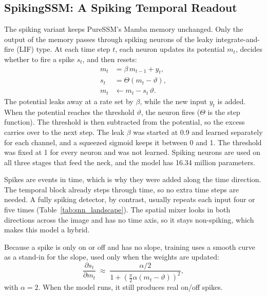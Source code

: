 \documentclass[11pt, a4paper]{report}
\begin{document}
\subsection{SpikingSSM: A Spiking Temporal Readout}
\label{subsec:spiking_method}
The spiking variant keeps PureSSM's Mamba memory unchanged. Only the output of the memory passes through
spiking neurons of the leaky integrate-and-fire (LIF) type. At each time step $t$, each neuron updates its
potential $m_t$, decides whether to fire a spike $s_t$, and then resets:
\begin{align}
  m_t &= \beta\, m_{t-1} + y_t, \label{eq:lif_integrate}\\
  s_t &= \Theta(m_t - \vartheta), \label{eq:lif_fire}\\
  m_t &\leftarrow m_t - s_t\,\vartheta. \label{eq:lif_reset}
\end{align}
The potential leaks away at a rate set by $\beta$, while the new input $y_t$ is added. When the potential
reaches the threshold $\vartheta$, the neuron fires ($\Theta$ is the step function). The threshold is then
subtracted from the potential, so the excess carries over to the next step. The leak $\beta$ was started at
0.9 and learned separately for each channel, and a squeezed sigmoid keeps it between 0 and 1. The
threshold was fixed at 1 for every neuron and was not learned. Spiking neurons are used on all three
stages that feed the neck, and the model has 16.34 million parameters.

Spikes are events in time, which is why they were added along the time direction. The temporal block already steps through time, so no extra time steps are needed. A fully spiking detector, by contrast,
usually repeats each input four or five times (Table~\ref{tab:snn_landscape}). The spatial mixer looks in
both directions across the image and has no time axis, so it stays non-spiking, which makes this model a
hybrid.

Because a spike is only on or off and has no slope, training uses a smooth curve as a stand-in for the slope,
used only when the weights are updated:
\begin{equation}
  \frac{\partial s_t}{\partial m_t} \;\approx\; \frac{\alpha/2}{1 + \left(\tfrac{\pi}{2}\alpha (m_t-\vartheta)\right)^2},
  \label{eq:surrogate}
\end{equation}
with $\alpha = 2$. When the model runs, it still produces real on/off spikes.
\end{document}
